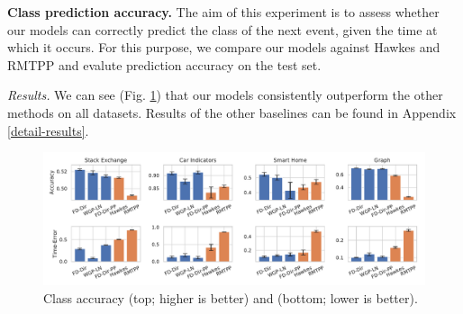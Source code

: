 \vspace{3mm}
\textbf{Class prediction accuracy.} The aim of this experiment is to assess whether our models can correctly predict the class of the next event, given the time at which it occurs. For this purpose, we compare our models against Hawkes and RMTPP and evalute prediction accuracy on the test set.

\textit{Results.} We can see (Fig. \ref{fig:accuracy}) that our models consistently outperform the other methods on all datasets. Results of the other baselines can be found in Appendix \ref{detail-results}.


\begin{figure}
\centering
    \includegraphics[width=\linewidth]{sections/010_neurips2019/paper/images/accuracy-final.pdf}
    \vspace*{-0.7cm}
    \caption{Class accuracy (top; higher is better) and \TimeScore (bottom; lower is better).}
    \label{fig:accuracy}
    \vspace*{-0.3cm}
\end{figure}
